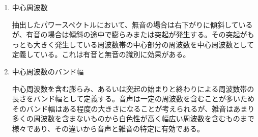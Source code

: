 \begin{enumerate}
\item 中心周波数\par
抽出したパワースペクトルにおいて、無音の場合は右下がりに傾斜しているが、有音の場合は傾斜の途中で膨らみまたは突起が発生する。その突起がもっとも大きく発生している周波数帯の中心部分の周波数を中心周波数として定義している。これは有音と無音の識別に効果がある。

\item 中心周波数のバンド幅\par
中心周波数を含む膨らみ、あるいは突起の始まりと終わりによる周波数帯の長さをバンド幅として定義する。音声は一定の周波数を含むことが多いためそのバンド幅はある程度の大きさになることが考えられるが、雑音はあまり多くの周波数を含まないものから白色性が高く幅広い周波数を含むものまで様々であり、その違いから音声と雑音の特定に有効である。
\end{enumerate}\par
